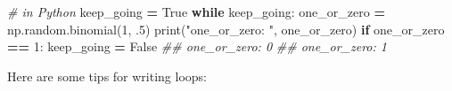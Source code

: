 \documentclass[
  12pt,
  krantz2]{krantz}
\makeatletter
\newenvironment{Shaded}{\begin{snugshade}}{\end{snugshade}}
\newcommand{\BuiltInTok}[1]{#1}
\newcommand{\CommentTok}[1]{\textcolor[rgb]{0.37,0.37,0.37}{\textit{#1}}}
\newcommand{\ControlFlowTok}[1]{\textcolor[rgb]{0.27,0.27,0.27}{\textbf{#1}}}
\newcommand{\DecValTok}[1]{\textcolor[rgb]{0.06,0.06,0.06}{#1}}
\newcommand{\FloatTok}[1]{\textcolor[rgb]{0.06,0.06,0.06}{#1}}
\newcommand{\NormalTok}[1]{#1}
\newcommand{\OperatorTok}[1]{\textcolor[rgb]{0.43,0.43,0.43}{\textbf{#1}}}
\newcommand{\StringTok}[1]{\textcolor[rgb]{0.5,0.5,0.5}{#1}}
\newcommand{\VariableTok}[1]{\textcolor[rgb]{0,0,0}{#1}}
\newenvironment{kframe}{%
\medskip{}
\setlength{\fboxsep}{.8em}
 \def\at@end@of@kframe{}%
 \ifinner\ifhmode%
  \def\at@end@of@kframe{\end{minipage}}%
  \begin{minipage}{\columnwidth}%
 \fi\fi%
 \def\FrameCommand##1{\hskip\@totalleftmargin \hskip-\fboxsep
 \colorbox{shadecolor}{##1}\hskip-\fboxsep
     \hskip-\linewidth \hskip-\@totalleftmargin \hskip\columnwidth}%
 \MakeFramed {\advance\hsize-\width
   \@totalleftmargin\z@ \linewidth\hsize
   \@setminipage}}%
 {\par\unskip\endMakeFramed%
 \at@end@of@kframe}
\renewenvironment{Shaded}{\begin{kframe}}{\end{kframe}}
\makeatother
\begin{document}
\begin{Shaded}
\begin{Highlighting}[]
\CommentTok{\# in Python}
\NormalTok{keep\_going }\OperatorTok{=} \VariableTok{True}
\ControlFlowTok{while}\NormalTok{ keep\_going:}
\NormalTok{    one\_or\_zero }\OperatorTok{=}\NormalTok{ np.random.binomial(}\DecValTok{1}\NormalTok{, }\FloatTok{.5}\NormalTok{) }
    \BuiltInTok{print}\NormalTok{(}\StringTok{"one\_or\_zero: "}\NormalTok{, one\_or\_zero)}
    \ControlFlowTok{if}\NormalTok{ one\_or\_zero }\OperatorTok{==} \DecValTok{1}\NormalTok{:}
\NormalTok{        keep\_going }\OperatorTok{=} \VariableTok{False}
\CommentTok{\#\# one\_or\_zero:  0}
\CommentTok{\#\# one\_or\_zero:  1}
\end{Highlighting}
\end{Shaded}

Here are some tips for writing loops:
\end{document}
